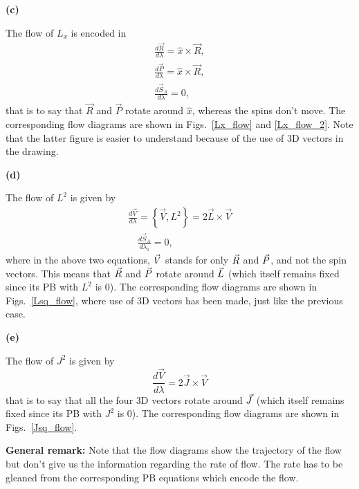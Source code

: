 \begin{Exercise}
\textbf{(c)}

The flow of $L_x$ is encoded in 
\begin{align}
\frac{d \vec{R}}{d \lambda}=\hat{x} \times \vec{R},   \\
\frac{d \vec{P}}{d \lambda}=\hat{x} \times \vec{R},     \\
\frac{d \vec{S}_A}{d \lambda}=  0,   
\end{align}
that is to say that $\vec{R}$ and $\vec{P}$ rotate around $\hat{x}$,
whereas the spins don't move.
The  corresponding flow diagrams are shown in
Figs.~\ref{Lx_flow} and \ref{Lx_flow_2}. Note that the latter figure
is easier to understand because of the use of 3D vectors in the
drawing.






\textbf{(d)}

The flow of $L^2$ is given by
\begin{align}
\frac{d \vec{V}}{d \lambda}=\left\{\vec{V}, L^{2}\right\}=2 \vec{L} \times \vec{V}  \\ 
\quad \frac{d \vec{S}_{A}}{d \lambda_{1}}=0,
\end{align}
where in the above two equations, $\vec{V}$ stands for only
$\vec{R}$ and $\vec{P}$, and not the spin vectors.
This means that $\vec{R}$ and $\vec{P}$
rotate around $\vec{L}$ (which itself remains fixed since its PB
with $L^2$ is 0).
The  corresponding flow diagrams are shown in
Figs.~\ref{Lsq_flow}, where use of 3D vectors has been made, just like the 
previous case.





\textbf{(e)}

The flow of $J^2$ is given by
\begin{equation}
\frac{d \vec{V}}{d \lambda}=2 \vec{J} \times \vec{V}
\end{equation}
that is to say that all the four 3D vectors
rotate around $\vec{J}$ (which itself remains fixed since its PB
with $J^2$ is 0).
The corresponding flow diagrams are shown in
Figs.~\ref{Jsq_flow}.


\textbf{General remark:} Note that the flow diagrams show the trajectory 
of the flow but don't give us the information regarding 
the rate of flow. The rate has to be gleaned from the 
corresponding PB equations which encode the flow.


\end{Exercise}





